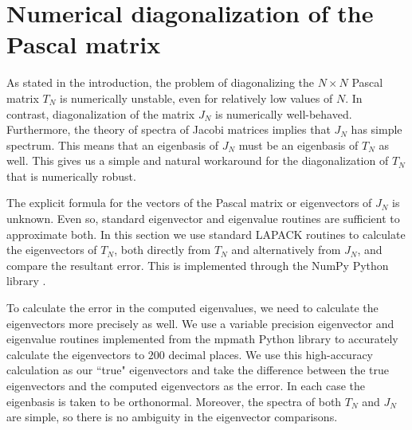 \documentclass[11pt]{amsart}
\theoremstyle{plain}
\newcommand{\cleqn}{\setcounter{equation}{0}}
\newcommand{\clth}{\setcounter{theorem}{0}}
\newcommand {\sectionnew}[1]{\section{#1}\cleqn\clth}
\theoremstyle{named}
\begin{document}
\sectionnew{Numerical diagonalization of the Pascal matrix}\label{num}
As stated in the introduction, the problem of diagonalizing the $N\times N$ Pascal matrix $T_N$ is numerically unstable, even for relatively low values of $N$.
In contrast, diagonalization of the matrix $J_N$ is numerically well-behaved.
Furthermore, the theory of spectra of Jacobi matrices implies that $J_N$ has simple spectrum.
This means that an eigenbasis of $J_N$ must be an eigenbasis of $T_N$ as well.
This gives us a simple and natural workaround for the diagonalization of $T_N$ that is numerically robust.

The explicit formula for the vectors of the Pascal matrix or eigenvectors of $J_N$ is unknown.
Even so, standard eigenvector and eigenvalue routines are sufficient to approximate both.
In this section we use standard LAPACK routines \cite{lapack} to calculate the eigenvectors of $T_N$, both directly from $T_N$ and alternatively from $J_N$, and compare the resultant error.
This is implemented through the NumPy Python library \cite{numpy}.

To calculate the error in the computed eigenvalues, we need to calculate the eigenvectors more precisely as well.
We use a variable precision eigenvector and eigenvalue routines implemented from the mpmath Python library \cite{mpmath} to accurately calculate the eigenvectors to $200$ decimal places.
We use this high-accuracy calculation as our ``true" eigenvectors and take the difference between the true eigenvectors and the computed eigenvectors as the error.
In each case the eigenbasis is taken to be orthonormal.
Moreover, the spectra of both $T_N$ and $J_N$ are simple, so there is no ambiguity in the eigenvector comparisons.
\end{document}

